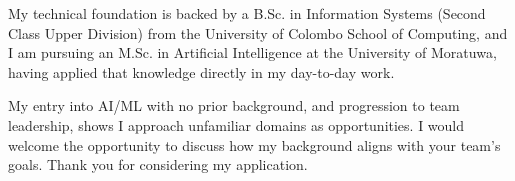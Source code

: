 \documentclass[11pt]{article}
\begin{document}
My technical foundation is backed by a B.Sc. in Information Systems (Second Class Upper Division) from the University of Colombo School of Computing, and I am pursuing an M.Sc. in Artificial Intelligence at the University of Moratuwa, having applied that knowledge directly in my day-to-day work.

My entry into AI/ML with no prior background, and progression to team leadership, shows I approach unfamiliar domains as opportunities. I would welcome the opportunity to discuss how my background aligns with your team's goals. Thank you for considering my application.

\end{document}
